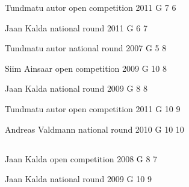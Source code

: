 \documentclass[11pt]{article}
\begin{document}
\ylDisplay{} %
{Tundmatu autor} %
{open competition} %
{2011} %
{G 7} %
{6} %
{

\ifEngStatement
\fi
}

\ylDisplay{} %
{Jaan Kalda} %
{national round} %
{2011} %
{G 6} %
{7} %
{

\ifEngStatement
\fi
}

\ylDisplay{} %
{Tundmatu autor} %
{national round} %
{2007} %
{G 5} %
{8} %
{

\ifEngStatement
\fi
}

\ylDisplay{} %
{Siim Ainsaar} %
{open competition} %
{2009} %
{G 10} %
{8} %
{

\ifEngStatement
\fi
}

\ylDisplay{} %
{Jaan Kalda} %
{national round} %
{2009} %
{G 8} %
{8} %
{

\ifEngStatement
\fi
}

\ylDisplay{} %
{Tundmatu autor} %
{open competition} %
{2011} %
{G 10} %
{9} %
{

\ifEngStatement
\fi
}

\ylDisplay{} %
{Andreas Valdmann} %
{national round} %
{2010} %
{G 10} %
{10} %
{

\ifEngStatement
\fi
}
\newpage\subsection{\protect{}}

\ylDisplay{} %
{Jaan Kalda} %
{open competition} %
{2008} %
{G 8} %
{7} %
{

\ifEngStatement
\fi
}

\ylDisplay{} %
{Jaan Kalda} %
{national round} %
{2009} %
{G 10} %
{9} %
{

\ifEngStatement
\fi
}
\newpage\subsection{\protect{}}
\end{document}
